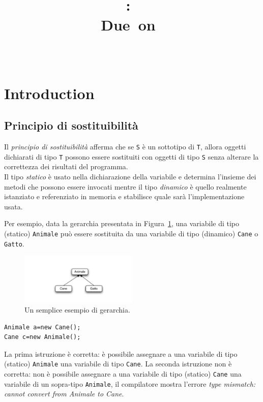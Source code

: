 \documentclass{article}
\title{
\vspace{2in}
\textmd{\textbf{\hmwkClass:\ \hmwkTitle}}\\
\normalsize\vspace{0.1in}\small{Due\ on\ \hmwkDueDate}\\
\vspace{0.1in}\large{\textit{\hmwkClassInstructor\ \hmwkClassTime}}
\vspace{3in}
}
\author{\textbf{\hmwkAuthorName}}
\date{} %
\begin{document}
\maketitle



\newpage
\tableofcontents
\newpage



\section{Introduction}


\subsection{Principio di sostituibilit\`a}
Il \emph{principio di sostituibilit\`a} afferma che se \texttt{S} \`e un sottotipo di \texttt{T}, allora oggetti dichiarati di tipo \texttt{T} possono essere sostituiti con oggetti di tipo \texttt{S} senza alterare la correttezza dei risultati del programma.\\
Il tipo  \emph{statico} \`e usato nella dichiarazione della variabile e determina l'insieme dei metodi che possono essere invocati mentre il tipo \emph{dinamico} \`e  quello realmente istanziato e referenziato in memoria e stabilisce quale sar\`a l'implementazione usata.

Per esempio, data la gerarchia presentata in Figura~\ref{Fig:gerarchy1}, una variabile di tipo (statico) \texttt{Animale} pu\`o essere sostituita da una variabile di tipo (dinamico) \texttt{Cane} o \texttt{Gatto}.

\begin{figure}[h!]
  \centering
    \includegraphics[width=0.5\textwidth]{gerarchia.pdf}
      \caption{Un semplice esempio di gerarchia.}
      \label{Fig:gerarchy1}
\end{figure}
\begin{lstlisting}
Animale a=new Cane();
Cane c=new Animale();
\end{lstlisting}
La prima istruzione \`e corretta: \`e possibile assegnare a una variabile di tipo (statico) \texttt{Animale} una variabile di tipo \texttt{Cane}.
La seconda istruzione non \`e corretta: non \`e possibile assegnare a una variabile di tipo (statico) \texttt{Cane} una variabile di un sopra-tipo \texttt{Animale}, il compilatore mostra l'errore \emph{type mismatch: cannot convert from Animale to Cane}.
\end{document}
